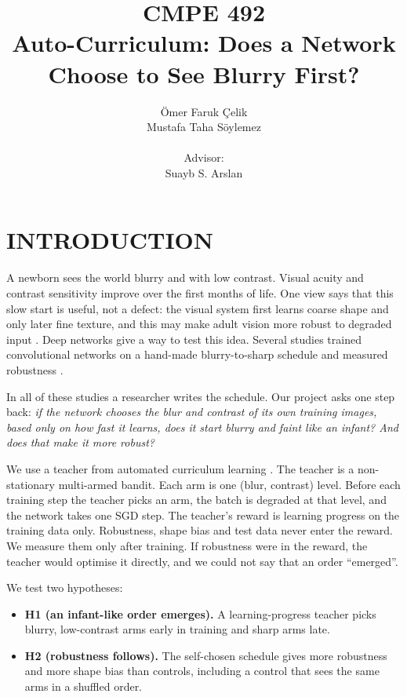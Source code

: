 \documentclass[a4paper,12pt]{report}
\begin{document}
\title{CMPE 492 \\ Auto-Curriculum: Does a Network \\ Choose to See Blurry First?}
\author{
Ömer Faruk Çelik \\
Mustafa Taha Söylemez \\ \\
Advisor: \\
Suayb S. Arslan
}
\date{}
\maketitle{}
\tableofcontents

\chapter{INTRODUCTION}

A newborn sees the world blurry and with low contrast. Visual acuity and contrast sensitivity improve over the first months of life. One view says that this slow start is useful, not a defect: the visual system first learns coarse shape and only later fine texture, and this may make adult vision more robust to degraded input \cite{vogelsang2018}. Deep networks give a way to test this idea. Several studies trained convolutional networks on a hand-made blurry-to-sharp schedule and measured robustness \cite{vogelsang2018,jang2021blurry,arslan2024noise}.

In all of these studies a researcher writes the schedule. Our project asks one step back: \emph{if the network chooses the blur and contrast of its own training images, based only on how fast it learns, does it start blurry and faint like an infant? And does that make it more robust?}

We use a teacher from automated curriculum learning \cite{graves2017}. The teacher is a non-stationary multi-armed bandit. Each arm is one (blur, contrast) level. Before each training step the teacher picks an arm, the batch is degraded at that level, and the network takes one SGD step. The teacher's reward is learning progress on the training data only. Robustness, shape bias and test data never enter the reward. We measure them only after training. If robustness were in the reward, the teacher would optimise it directly, and we could not say that an order ``emerged''.

We test two hypotheses:
\begin{itemize}
\item \textbf{H1 (an infant-like order emerges).} A learning-progress teacher picks blurry, low-contrast arms early in training and sharp arms late.
\item \textbf{H2 (robustness follows).} The self-chosen schedule gives more robustness and more shape bias than controls, including a control that sees the same arms in a shuffled order.
\end{itemize}
\end{document}
